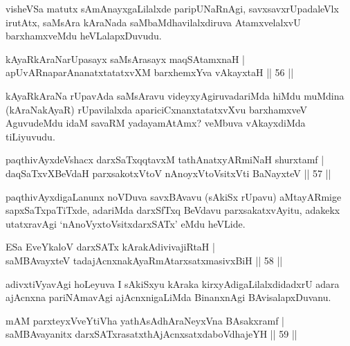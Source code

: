 \begin{artha}
visheVSa matutx sAmAnayxgaLilalxde paripUNaRnAgi, savxsavxrUpadaleVlx irutAtx, saMsAra kAraNada saMbaMdhavilalxdiruva AtamxvelalxvU barxhamxveMdu heVLalapxDuvudu.
\end{artha}

\begin{shl}
kAyaRkAraNarUpasayx saMsArasayx maqSAtamxnaH |\\
apUvARnaparAnanatxtatatxvXM barxhemxYva vAkayxtaH \hfill || 56 ||
\end{shl}

\begin{artha}%
kAyaRkAraNa rUpavAda saMsAravu videyxyAgiruvadariMda hiMdu muMdina (kAraNakAyaR) rUpavilalxda apariciCxnanxtatatxvXvu barxhamxveV AguvudeMdu idaM savaRM yadayamAtAmx? veMbuva vAkayxdiMda tiLiyuvudu.
\end{artha}

\begin{shl}
paqthivAyxdeVshacx darxSaTxqqtavxM tathA\s natxyARmiNaH shurxtamf |\\
daqSaTxvXBeVdaH parxsakotxV\s toV nAnoyxV\s toV\s sitxVti BaNayxteV \hfill || 57 ||
\end{shl}

\begin{artha}
paqthivAyxdigaLanunx noVDuva savxBAvavu (sAkiSx rUpavu) aMtayARmige sapxSaTxpaTiTxde, adariMda darxSfTxq BeVdavu parxsakatxvAyitu, adakekx utatxravAgi `nAnoVyxtoV\s sitxdarxSATx' eMdu heVLide.
\end{artha}


\begin{shl}
ESa EveYkaloV darxSATx kArakAdivivajiRtaH |\\
saMBAvayxteV tadajAcnxnakAyaRmAtarxsatxmasivxBiH \hfill || 58 ||
\end{shl}

\begin{artha}
adivxtiVyavAgi hoLeyuva I sAkiSxyu kAraka kirxyAdigaLilalxdidadxrU adara ajAcnxna pariNAmavAgi ajAcnxnigaLiMda BinanxnAgi BAvisalapxDuvanu.
\end{artha}

\begin{shl}
mAM parxteyxVveYtiVha yathA\s sAdhAraNeyxVna BAsakxramf |\\
saMBAvayanitx darxSATxrasatxthA\s jAcnxsatxdaboVdhajeYH \hfill || 59 ||
\end{shl}

